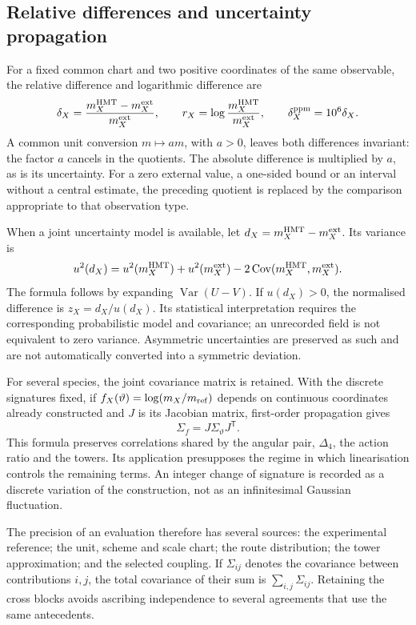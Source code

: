\subsection{Relative differences and uncertainty propagation}
\label{subsec:vi-residuales}

For a fixed common chart and two positive coordinates of the same observable,
the relative difference and logarithmic difference are
\[
 \delta_X=\frac{m_X^{\rm HMT}-m_X^{\rm ext}}{m_X^{\rm ext}},
 \qquad r_X=\log\frac{m_X^{\rm HMT}}{m_X^{\rm ext}},
 \qquad \delta_X^{\rm ppm}=10^6\delta_X.
\]
A common unit conversion \(m\mapsto am\), with \(a>0\),
leaves both differences invariant: the factor \(a\) cancels in the
quotients. The absolute difference is multiplied by \(a\), as is
its uncertainty. For a zero external value, a one-sided bound or an
interval without a central estimate, the preceding quotient is replaced by
the comparison appropriate to that observation type.

When a joint uncertainty model is available, let
\(d_X=m_X^{\rm HMT}-m_X^{\rm ext}\). Its variance is
\[
 u^2(d_X)=u^2(m_X^{\rm HMT})+u^2(m_X^{\rm ext})
          -2\operatorname{Cov}(m_X^{\rm HMT},m_X^{\rm ext}).
\]
The formula follows by expanding
\(\operatorname{Var}(U-V)\). If \(u(d_X)>0\), the normalised
difference is \(z_X=d_X/u(d_X)\). Its statistical interpretation requires
the corresponding probabilistic model and covariance; an unrecorded field
is not equivalent to zero variance. Asymmetric uncertainties
are preserved as such and are not automatically converted into a symmetric
deviation.

For several species, the joint covariance matrix is retained. With
the discrete signatures fixed, if \(f_X(\vartheta)=\log(m_X/m_{\rm ref})\)
depends on continuous coordinates already constructed and \(J\) is its
Jacobian matrix, first-order propagation gives
\[
 \Sigma_f=J\Sigma_\vartheta J^{\mathsf T}.
\]
This formula preserves correlations shared by the angular pair,
\(\Delta_4\), the action ratio and the towers. Its application presupposes
the regime in which linearisation controls the remaining terms.
An integer change of signature is recorded as a discrete variation of the
construction, not as an infinitesimal Gaussian fluctuation.

The precision of an evaluation therefore has several sources: the
experimental reference; the unit, scheme and scale chart; the
route distribution; the tower approximation; and the selected
coupling. If \(\Sigma_{ij}\) denotes the covariance between
contributions \(i,j\), the total covariance of their sum is
\(\sum_{i,j}\Sigma_{ij}\). Retaining the cross blocks avoids
ascribing independence to several agreements that use the same
antecedents.

